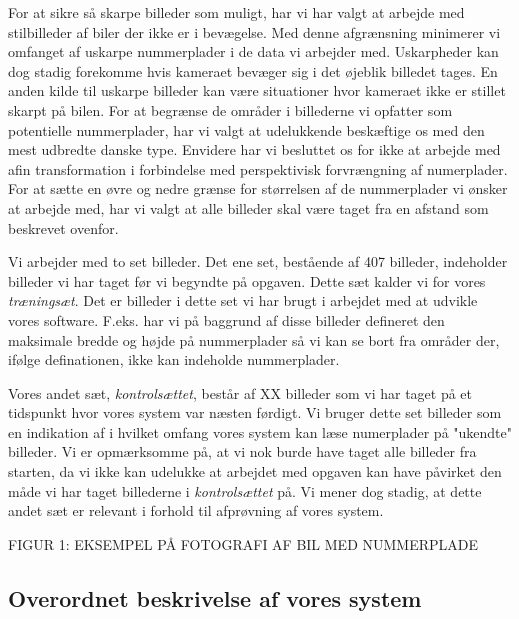 \documentclass[11pt,a4paper,draft]{article}
\begin{document}
For at sikre så skarpe billeder som muligt, har vi har valgt at arbejde med stilbilleder af biler der ikke er i bevægelse. Med denne afgrænsning minimerer vi omfanget af uskarpe nummerplader i de data vi arbejder med. Uskarpheder kan dog stadig forekomme hvis kameraet bevæger sig i det øjeblik billedet tages. En anden kilde til uskarpe billeder kan være situationer hvor kameraet ikke er stillet skarpt på bilen. For at begrænse de områder i billederne vi opfatter som potentielle nummerplader, har vi valgt at udelukkende beskæftige os med den mest udbredte danske type. Envidere har vi besluttet os for ikke at arbejde med afin transformation i forbindelse med perspektivisk forvrængning af numerplader. For at sætte en øvre og nedre grænse for størrelsen af de nummerplader vi ønsker at arbejde med, har vi valgt at alle billeder skal være taget fra en afstand som beskrevet ovenfor.

Vi arbejder med to set billeder. Det ene set, bestående af 407 billeder, indeholder billeder vi har taget før vi begyndte på opgaven. Dette sæt kalder vi for vores \textit{træningsæt}. Det er billeder i dette set vi har brugt i arbejdet med at udvikle vores software. F.eks. har vi på baggrund af disse billeder defineret den maksimale bredde og højde på nummerplader så vi kan se bort fra områder der, ifølge definationen, ikke kan indeholde nummerplader.

Vores andet sæt, \textit{kontrolsættet}, består af XX  billeder som vi har taget på et tidspunkt hvor vores system var næsten førdigt. Vi bruger dette set billeder som en indikation af i hvilket omfang vores system kan læse numerplader på "ukendte" billeder. Vi er opmærksomme på, at vi nok burde have taget alle billeder fra starten, da vi ikke kan udelukke at arbejdet med opgaven kan have påvirket den måde vi har taget billederne i \textit{kontrolsættet} på. Vi mener dog stadig, at dette andet sæt er relevant i forhold til afprøvning af vores system.

FIGUR 1: EKSEMPEL PÅ FOTOGRAFI AF BIL MED NUMMERPLADE

\subsection{Overordnet beskrivelse af vores system}
\end{document}
